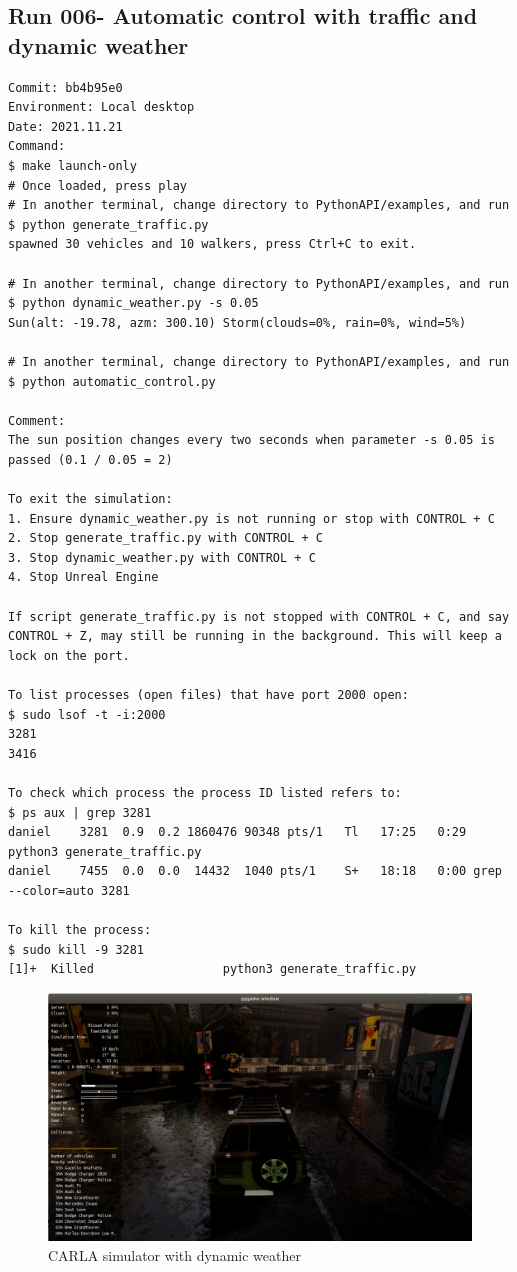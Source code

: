 \subsection{Run 006- Automatic control with traffic and dynamic weather}
\label{app_res:006}
\begin{verbatim}
Commit: bb4b95e0
Environment: Local desktop
Date: 2021.11.21
Command:
$ make launch-only
# Once loaded, press play
# In another terminal, change directory to PythonAPI/examples, and run
$ python generate_traffic.py 
spawned 30 vehicles and 10 walkers, press Ctrl+C to exit.

# In another terminal, change directory to PythonAPI/examples, and run
$ python dynamic_weather.py -s 0.05
Sun(alt: -19.78, azm: 300.10) Storm(clouds=0%, rain=0%, wind=5%)  

# In another terminal, change directory to PythonAPI/examples, and run
$ python automatic_control.py

Comment:
The sun position changes every two seconds when parameter -s 0.05 is 
passed (0.1 / 0.05 = 2)

To exit the simulation:
1. Ensure dynamic_weather.py is not running or stop with CONTROL + C
2. Stop generate_traffic.py with CONTROL + C
3. Stop dynamic_weather.py with CONTROL + C
4. Stop Unreal Engine

If script generate_traffic.py is not stopped with CONTROL + C, and say CONTROL + Z, may still be running in the background. This will keep a lock on the port.

To list processes (open files) that have port 2000 open:
$ sudo lsof -t -i:2000
3281
3416

To check which process the process ID listed refers to:
$ ps aux | grep 3281
daniel    3281  0.9  0.2 1860476 90348 pts/1   Tl   17:25   0:29 python3 generate_traffic.py
daniel    7455  0.0  0.0  14432  1040 pts/1    S+   18:18   0:00 grep --color=auto 3281

To kill the process:
$ sudo kill -9 3281
[1]+  Killed                  python3 generate_traffic.py

\end{verbatim}

\begin{figure}[h!]
\centering
\includegraphics[width=\textwidth]{Figures/carla-rain.png}
\caption{CARLA simulator with dynamic weather}
\label{fig:carla-rain}
\end{figure}

